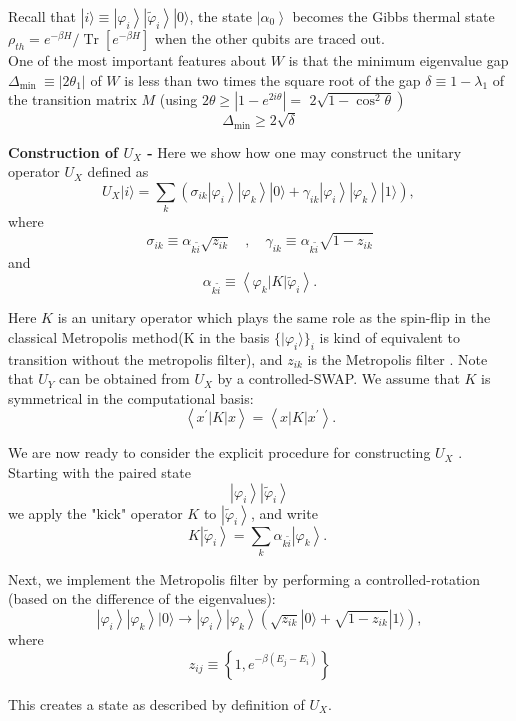 \begin{flushleft}
	Recall that $|i\rangle \equiv\left|\varphi_i\right\rangle\left|\tilde{\varphi}_i\right\rangle|0\rangle$, the state $\left|\alpha_0\right\rangle$ becomes the Gibbs thermal state $\rho_{t h}=e^{-\beta H} / \operatorname{Tr}\left[e^{-\beta H}\right]$ when the other qubits are traced out.\\
	One of the most important features about $W$ is that the minimum eigenvalue gap $\Delta_{\text {min }} \equiv\left|2 \theta_1\right|$ of $W$ is less than two times the square root of the gap $\delta \equiv 1-\lambda_1$ of the transition matrix $M$ (using $2 \theta \geq\left|1-e^{2 i \theta}\right|=$ $\left.2 \sqrt{1-\cos ^2 \theta}\right)$
	$$
	\Delta_{\min } \geq 2 \sqrt{\delta}
	$$
\end{flushleft}
\begin{flushleft}
	\textbf{Construction of $U_X$ -}
	Here we show how one may construct the unitary operator $U_X$ defined as
	$$
	U_X|i\rangle=\sum_k\left(\sigma_{i k}\left|\varphi_i\right\rangle\left|\varphi_k\right\rangle|0\rangle+\gamma_{i k}\left|\varphi_i\right\rangle\left|\varphi_k\right\rangle|1\rangle\right) \text {, }
	$$
	where
	$$
	\sigma_{i k} \equiv \alpha_{k \tilde{i}} \sqrt{z_{i k}} \quad, \quad \gamma_{i k} \equiv \alpha_{k \tilde{i}} \sqrt{1-z_{i k}}
	$$
	and
	$$
	\alpha_{k \tilde{i}} \equiv\left\langle\varphi_k|K| \tilde{\varphi}_i\right\rangle .
	$$
	
	Here $K$ is an unitary operator which plays the same role as the spin-flip in the classical Metropolis method(K in the basis $\{|\varphi_i\rangle \}_i$ is kind of equivalent to transition without the metropolis filter), and $z_{i k}$ is the Metropolis filter . Note that $U_Y$ can be obtained from $U_X$ by a controlled-SWAP.  We assume that $K$ is symmetrical in the computational basis:
	$$
	\left\langle x^{\prime}|K| x\right\rangle=\left\langle x|K| x^{\prime}\right\rangle .
	$$
	
	We are now ready to consider the explicit procedure for constructing $U_X$ . Starting with the paired state
	$$
	\left|\varphi_i\right\rangle\left|\tilde{\varphi}_i\right\rangle
	$$
	we apply the "kick" operator $K$ to $\left|\tilde{\varphi}_i\right\rangle$, and write
	$$
	K\left|\tilde{\varphi}_i\right\rangle=\sum_k \alpha_{k \tilde{i}}\left|\varphi_k\right\rangle \text {. }
	$$
	
	Next, we implement the Metropolis filter by performing a controlled-rotation (based on the difference of the eigenvalues):
	$$
	\left|\varphi_i\right\rangle\left|\varphi_k\right\rangle|0\rangle \rightarrow\left|\varphi_i\right\rangle\left|\varphi_k\right\rangle\left(\sqrt{z_{i k}}|0\rangle+\sqrt{1-z_{i k}}|1\rangle\right),
	$$
	where
	$$
	z_{i j} \equiv\left\{1, e^{-\beta\left(E_j-E_i\right)}\right\}
	$$
	
	This creates a state as described by definition of $U_X$.
	
\end{flushleft}

